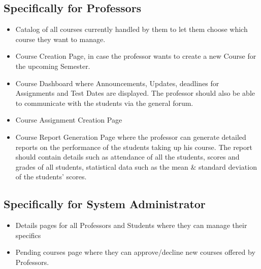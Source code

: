 \documentclass[12pt, a4]{report}
\begin{document}
\subsection{Specifically for Professors}
\begin{itemize}
    \item Catalog of all courses currently handled by them to let them choose which course they want to manage.
    \item Course Creation Page, in case the professor wants to create a new Course for the upcoming Semester.
    \item Course Dashboard where Announcements, Updates, deadlines for Assignments and Test Dates are displayed. The professor should also be able to communicate with the students via the general forum.
    \item Course Assignment Creation Page
    \item Course Report Generation Page where the professor can generate detailed reports on the performance of the students taking up his course. The report should contain details such as attendance of all the students, scores and grades of all students, statistical data such as the mean \& standard deviation of the students' scores.
\end{itemize}

\subsection{Specifically for System Administrator}
\begin{itemize}
    \item Details pages for all Professors and Students where they can manage their specifics
    \item Pending courses page where they can approve/decline new courses offered by Professors.
\end{itemize}

\end{document}
